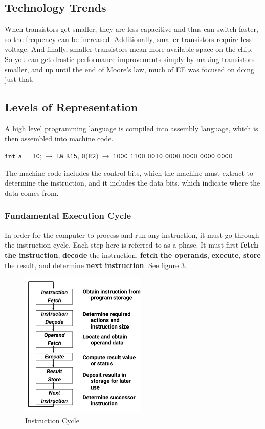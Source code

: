 \documentclass{article}
\begin{document}
\subsection{Technology Trends}

When transistors get smaller, they are less capacitive and thus can switch faster, so the frequency can be increased. Additionally, smaller transistors require less voltage. And finally, smaller transistors mean more available space on the chip. So you can get drastic performance improvements simply by making transistors smaller, and up until the end of Moore's law, much of EE was focused on doing just that.




\subsection{Levels of Representation}

A high level programming language is compiled into assembly language, which is then assembled into machine code. 


$\texttt{int a = 10;}\ \rightarrow\ \texttt{LW R15, 0(R2)}\ \rightarrow\ \texttt{1000 1100 0010 0000 0000 0000 0000} $

The machine code includes the control bits, which the machine must extract to determine the instruction, and it includes the data bits, which indicate where the data comes from. 

\subsubsection{Fundamental Execution Cycle}

In order for the computer to process and run any instruction, it must go through the instruction cycle. Each step here is referred to as a phase. It must first \textbf{fetch the instruction}, \textbf{decode} the instruction, \textbf{fetch the operands}, \textbf{execute}, \textbf{store} the result, and determine \textbf{next instruction}. See figure 3.


\begin{figure}[ht!]
\centering
\includegraphics[width=60mm]{img/InstructionCycle.png}
\caption{Instruction Cycle}
\end{figure}
\end{document}
